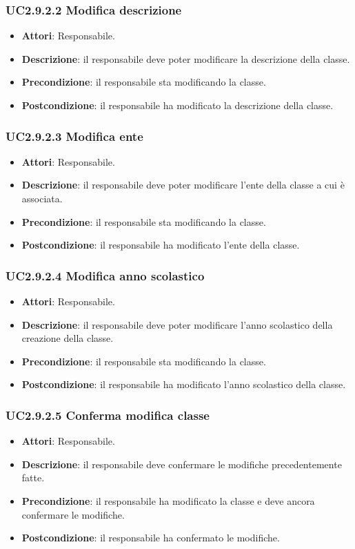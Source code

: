 \subsubsection{UC2.9.2.2 Modifica descrizione}
\begin{itemize}
\item \textbf{Attori}: Responsabile.
\item \textbf{Descrizione}: il responsabile deve poter modificare la descrizione della classe.
\item \textbf{Precondizione}: il responsabile sta modificando la classe.
\item \textbf{Postcondizione}: il responsabile ha modificato la descrizione della classe.
\end{itemize}
\subsubsection{UC2.9.2.3 Modifica ente}
\begin{itemize}
\item \textbf{Attori}: Responsabile.
\item \textbf{Descrizione}: il responsabile deve poter modificare l'ente della classe a cui è associata.
\item \textbf{Precondizione}: il responsabile sta modificando la classe.
\item \textbf{Postcondizione}: il responsabile ha modificato l'ente della classe.
\end{itemize}
\subsubsection{UC2.9.2.4 Modifica anno scolastico}
\begin{itemize}
\item \textbf{Attori}: Responsabile.
\item \textbf{Descrizione}: il responsabile deve poter modificare l'anno scolastico della creazione della classe.
\item \textbf{Precondizione}: il responsabile sta modificando la classe.
\item \textbf{Postcondizione}: il responsabile ha modificato l'anno scolastico della classe.
\end{itemize}
\subsubsection{UC2.9.2.5 Conferma modifica classe}
\begin{itemize}
\item \textbf{Attori}: Responsabile.
\item \textbf{Descrizione}: il responsabile deve confermare le modifiche precedentemente fatte.
\item \textbf{Precondizione}: il responsabile ha modificato la classe e deve ancora confermare le modifiche.
\item \textbf{Postcondizione}: il responsabile ha confermato le modifiche.
\end{itemize}
